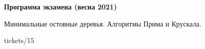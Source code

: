 \documentclass[specialist, subf, href, colorlinks=true, 12pt, times, mtpro, final]{disser}
\begin{document}
\tableofcontents

\newpage
{\Large \bf Программа экзамена (весна 2021)}

\begin{enumerate}
{\footnotesize
\item Минимальные остовные деревья. Алгоритмы Прима и Крускала.
}
\end{enumerate}

 {tickets/15}
 
\end{document}
